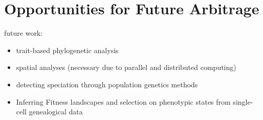 \section{Opportunities for Future Arbitrage} \label{sec:opportunities}

future work:
\begin{itemize}
  \item trait-based phylogenetic analysis
  \item spatial analyses (necessary due to parallel and distributed computing)
  \item detecting speciation through population genetics methods \citep{sukumaran2021incorporating}
  \item Inferring Fitness landscapes and selection on phenotypic states from single-cell genealogical data \citep{nozoe2017inferring}
\end{itemize}
